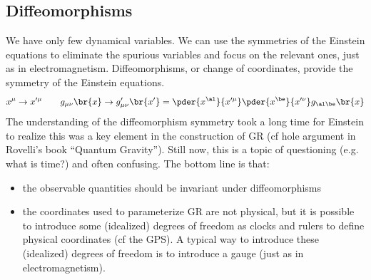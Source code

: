 \documentclass{article}
\begin{document}
\subsection{Diffeomorphisms}
We have only few dynamical variables. We can use the symmetries of the Einstein equations to eliminate the spurious variables and focus on the relevant ones, just as in electromagnetism. Diffeomorphisms, or change of coordinates, provide the symmetry of the Einstein equations.
\[ x^\mu \to x'^\mu \qquad g_{\mu\nu}\br{x} \to g'_{\mu\nu}\br{x'} = \pder{x^\al}{x'^\mu}\pder{x^\be}{x'^\nu}g_{\al\be}\br{x} \]
The understanding of the diffeomorphism symmetry took a long time for Einstein to realize this was a key element in the construction of GR (cf hole argument in Rovelli’s book “Quantum Gravity”). Still now, this is a topic of questioning (e.g. what is time?) and often confusing. The bottom line is that:
\begin{itemize}
    \item the observable quantities should be invariant under diffeomorphisms
    \item the coordinates used to parameterize GR are not physical, but it is possible to introduce some (idealized) degrees of freedom as clocks and rulers to define physical coordinates (cf the GPS). A typical way to introduce these (idealized) degrees of freedom is to introduce a gauge (just as in electromagnetism).
\end{itemize}
\end{document}
